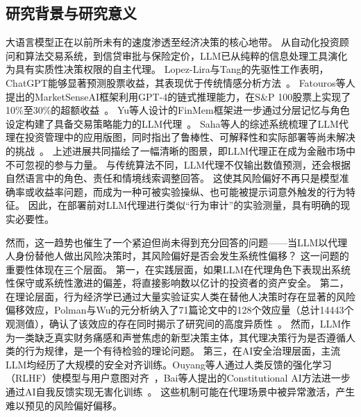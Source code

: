 \maketitle
\thispagestyle{plain}
\subsection{研究背景与研究意义}

大语言模型正在以前所未有的速度渗透至经济决策的核心地带。
从自动化投资顾问和算法交易系统，到信贷审批与保险定价，LLM已从纯粹的信息处理工具演化为具有实质性决策权限的自主代理。
Lopez-Lira与Tang的先驱性工作表明，ChatGPT能够显著预测股票收益，其表现优于传统情感分析方法~\cite{LopezLira2023Can}。
Fatouros等人提出的MarketSenseAI框架利用GPT-4的链式推理能力，在S\&P 100股票上实现了10\%至30\%的超额收益~\cite{Fatouros2024Can}。
Yu等人设计的FinMem框架进一步通过分层记忆与角色设定构建了具备交易策略能力的LLM代理~\cite{Yu2023FinMem}。
Saha等人的综述系统梳理了LLM代理在投资管理中的应用版图，同时指出了鲁棒性、可解释性和实际部署等尚未解决的挑战~\cite{Saha2025Large}。
上述进展共同描绘了一幅清晰的图景，即LLM代理正在成为金融市场中不可忽视的参与力量。
与传统算法不同，LLM代理不仅输出数值预测，还会根据自然语言中的角色、责任和情境线索调整回答。
这使其风险偏好不再只是模型准确率或收益率问题，而成为一种可被实验操纵、也可能被提示词意外触发的行为特征。
因此，在部署前对LLM代理进行类似“行为审计”的实验测量，具有明确的现实必要性。

然而，这一趋势也催生了一个紧迫但尚未得到充分回答的问题——当LLM以代理人身份替他人做出风险决策时，其风险偏好是否会发生系统性偏移？
这一问题的重要性体现在三个层面。
第一，在实践层面，如果LLM在代理角色下表现出系统性保守或系统性激进的偏差，将直接影响数以亿计的投资者的资产安全。
第二，在理论层面，行为经济学已通过大量实验证实人类在替他人决策时存在显著的风险偏移效应，Polman与Wu的元分析纳入了71篇论文中的128个效应量（总计14443个观测值），确认了该效应的存在同时揭示了研究间的高度异质性~\cite{Polman2020Decision}。
然而，LLM作为一类缺乏真实财务痛感和声誉焦虑的新型决策主体，其代理决策行为是否遵循人类的行为规律，是一个有待检验的理论问题。
第三，在AI安全治理层面，主流LLM均经历了大规模的安全对齐训练。Ouyang等人通过人类反馈的强化学习（RLHF）使模型与用户意图对齐~\cite{Ouyang2022Training}，Bai等人提出的Constitutional AI方法进一步通过AI自我反馈实现无害化训练~\cite{Bai2022Constitutional}。
这些机制可能在代理场景中被异常激活，产生难以预见的风险偏好偏移。

